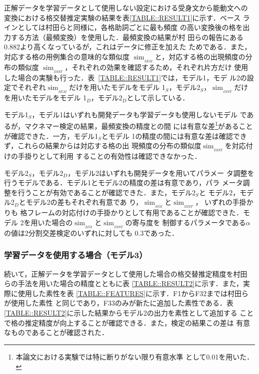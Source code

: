 \documentclass[japanese]{jnlp_1.4}
\begin{document}
   正解データを学習データとして使用しない設定における受身文から能動文への
   変換における格交替推定実験の結果を表\ref{TABLE::RESULT1}に示す．ベース
   ラインとしては村田ら\citeyear{Murata2008}と同様に，各格助詞ごとに最も頻度
   の高い変換後の格を出力する方法（最頻変換）を使用した．最頻変換の結果が村
   田らの報告にある0.882より高くなっているが，これはデータに修正を加えた
   ためである．また，対応する格の用例集合の意味的な類似度
   $\operatorname{sim}_{_\mathit{SEM}}$と，対応する格の出現頻度の分布の類似度
   $\operatorname{sim}_{_\mathit{DIST}}$，それぞれの効果を確認するため，それぞれ片方だけ
   使用した場合の実験も行った．表~\ref{TABLE::RESULT1}では，モデル1，モデ
   ル2の設定でそれぞれ$\operatorname{sim}_{_\mathit{SEM}}$だけを用いたモデルをモデル
   1$_S$，モデル2$_S$，$\operatorname{sim}_{_\mathit{DIST}}$だけを用いたモデルをモデル
   1$_D$，モデル2$_D$として示している．
  
   モデル1$_S$，モデル1はいずれも開発データも学習データも使用しないモデル
   であるが，マクネマー検定\cite{McNemar1947}の結果，最頻変換の精度との間
   には有意な差\footnote{本論文における実験では特に断りがない限り有意水準
   として0.01を用いた．}があることが確認できた．一方，モデル1$_S$とモデル
   1の精度の間には有意な差は確認できず，これらの結果からは対応する格の出
   現頻度の分布の類似度$\operatorname{sim}_{_\mathit{DIST}}$を対応付けの手掛りとして利用
   することの有効性は確認できなかった．

   モデル2$_S$，モデル2$_D$，モデル2はいずれも開発データを用いてパラメー
   タ調整を行うモデルである．モデル1とモデル2の精度の差は有意であり，パラ
   メータ調整を行うことが有効であることが確認できた．また，モデル2$_S$と
   モデル2，モデル2$_D$とモデル2の差もそれぞれ有意であ
   り，$\operatorname{sim}_{_\mathit{SIM}}$と$\operatorname{sim}_{_\mathit{DIST}}$，
いずれの手掛かりも
   格フレームの対応付けの手掛かりとして有用であることが確認できた．モデル
   2を用いた場合の$\operatorname{sim}_{_\mathit{SIM}}$と$\operatorname{sim}_{_\mathit{DIST}}$の寄与度を
   制御するパラメータである$\alpha$の値は2分割交差検定のいずれに対しても
   0.3であった．

   \subsubsection{学習データを使用する場合（モデル3）}

   続いて，正解データを学習データとして使用した場合の格交替推定精度を村田
   らの手法\cite{Murata2008}を用いた場合の精度とともに表
   \ref{TABLE::RESULT2}に示す．また，実際に使用した素性を表
   \ref{TABLE::FEATURES}に示す．F1からF32までは村田らが使用した素性
   \cite{Murata2008}と同じであり，F33のみが新たに追加した素性である．表
   \ref{TABLE::RESULT2}に示した結果からモデル2の出力を素性として追加する
   ことで格の推定精度が向上することが確認できる．また，検定の結果この差は
   有意なものであることが確認された．
\end{document}
